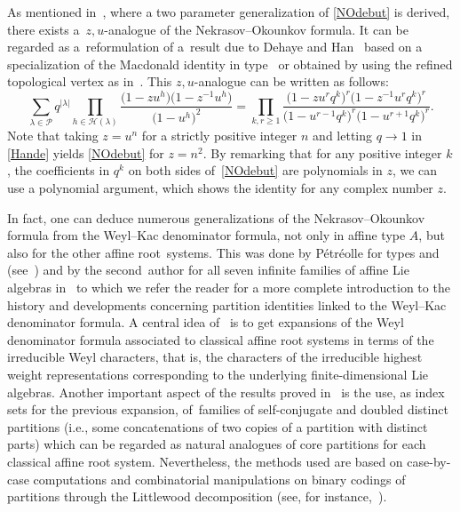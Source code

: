 \documentclass[pdftex]{sigma}
\numberwithin{equation}{section}
\def\cch{\mathcal H}
\def\ccp{\mathcal P}
\begin{document}
As mentioned in~\cite{CRV,RW}, where a two parameter generalization of \eqref{NOdebut} is derived, there exists a~$z,u$-analogue of the Nekrasov--Okounkov formula. It can be regarded as a~reformulation of a~result due to Dehaye and Han~\cite{HD} based on a specialization of the Macdonald identity in type~ or obtained by using the refined topological vertex as in~\cite{INRS}. This $z,u$-analogue can be written as follows:
\begin{equation}\label{Hande}
\sum_{\lambda\in\ccp}q^{\lvert \lambda\rvert}\prod_{h\in\cch(\lambda)}\frac{\bigl(1-zu^h\bigr)\bigl(1-z^{-1}u^h\bigr)}{\bigl(1-u^h\bigr)^2}=\prod_{k,r\geq 1}\frac{\bigl(1-zu^rq^k\bigr)^r\bigl(1-z^{-1}u^rq^k\bigr)^r}{\bigl(1-u^{r-1}q^k\bigr)^r\bigl(1-u^{r+1}q^k\bigr)^r}.
\end{equation}
\noindent Note that taking $z=u^n$ for a strictly positive integer $n$ and letting $q\rightarrow 1$ in \eqref{Hande} yields \eqref{NOdebut} for $z=n^2$. By remarking that for any positive integer $k$, the coefficients in $q^k$ on both sides of~\eqref{NOdebut} are polynomials in $z$, we can use a polynomial argument, which shows the identity for any complex number $z$.

In fact, one can deduce numerous generalizations of the
Nekrasov--Okounkov formula from the Weyl--Kac denominator formula, not only in
affine type $A$, but also for the other affine root~systems. This was done by P\'etr\'eolle for types  and  (see~\cite{MP}) and by the second~author for all seven infinite families of affine Lie algebras in~\cite[Section $5.3$]{Wmac} to which we refer the reader
for a more complete introduction to the history and developments concerning partition identities linked to the Weyl--Kac denominator formula. A central idea of~\cite{Wmac} is to get expansions of
the Weyl denominator formula associated to classical affine root systems in
terms of the irreducible Weyl characters, that is, the characters of the
irreducible highest weight representations corresponding to the underlying
finite-dimensional Lie algebras. Another important aspect of the results
proved in~\cite{Wmac} is the use, as index sets for the previous expansion,
of~families of self-conjugate and doubled distinct partitions (i.e., some concatenations of two copies of a partition with distinct parts) which can be regarded as natural analogues of core partitions for each classical affine root system. Nevertheless, the methods used are based on case-by-case
computations and combinatorial manipulations on binary codings of
partitions through the Littlewood decomposition (see, for instance,~\cite{HJ}).
\end{document}
